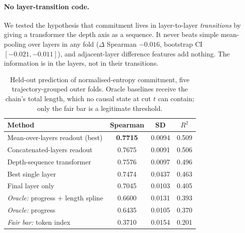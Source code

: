 \documentclass{article}
\begin{document}
\paragraph{No layer-transition code.} We tested the hypothesis that commitment lives in
layer-to-layer \emph{transitions} by giving a transformer the depth axis as a sequence. It
never beats simple mean-pooling over layers in any fold ($\Delta$ Spearman $-0.016$,
bootstrap CI $[-0.021,-0.011]$), and adjacent-layer difference features add nothing. The
information is in the layers, not in their transitions.

\begin{table}[t]
  \centering
  \small
  \caption{Held-out prediction of normalised-entropy commitment, five trajectory-grouped
  outer folds. Oracle baselines receive the chain's total length, which no causal state at
  cut $t$ can contain; only the fair bar is a legitimate threshold.}
  \label{tab:probes}
  \begin{tabular}{lccc}
    \toprule
    Method & Spearman & SD & $R^2$ \\
    \midrule
    Mean-over-layers readout (best)      & \textbf{0.7715} & 0.0094 & 0.509 \\
    Concatenated-layers readout          & 0.7675 & 0.0091 & 0.506 \\
    Depth-sequence transformer           & 0.7576 & 0.0097 & 0.496 \\
    Best single layer                    & 0.7474 & 0.0437 & 0.463 \\
    Final layer only                     & 0.7045 & 0.0103 & 0.405 \\
    \midrule
    \textit{Oracle:} progress + length spline & 0.6600 & 0.0131 & 0.393 \\
    \textit{Oracle:} progress                 & 0.6435 & 0.0105 & 0.370 \\
    \textit{Fair bar:} token index            & 0.3710 & 0.0154 & 0.201 \\
    \bottomrule
  \end{tabular}
\end{table}
\end{document}
